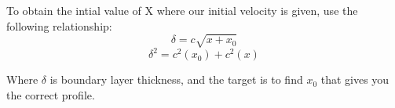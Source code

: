 \documentclass[letterpaper,12pt]{article}
\begin{document}
To obtain the intial value of X where our initial velocity is given, use the following relationship:
\begin{equation}
    \delta = c \sqrt{x + x_0}
\end{equation}
\begin{equation}
    \delta^2 = c^2(x_0) + c^2(x)
\end{equation}

Where $\delta$ is boundary layer thickness, and the target is to find $x_0$ that gives you the correct profile.
\end{document}
